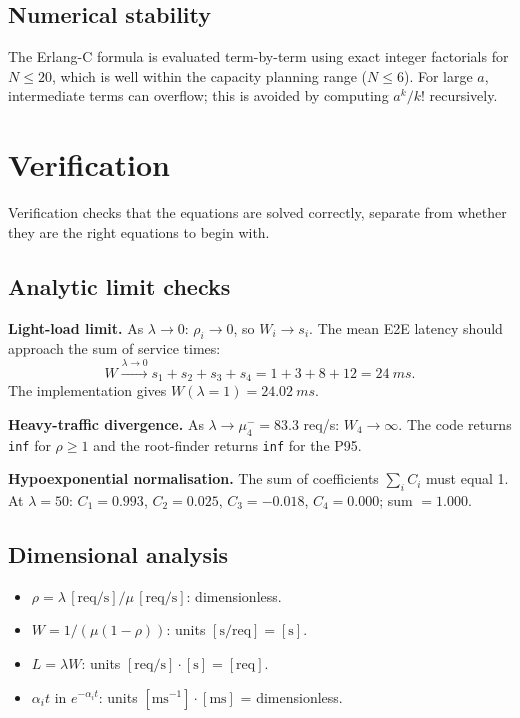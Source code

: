 \documentclass[12pt,a4paper]{article}
\begin{document}
\subsection{Numerical stability}

The Erlang-C formula is evaluated term-by-term using exact integer factorials for $N \leq 20$,
which is well within the capacity planning range ($N \leq 6$). For large $a$, intermediate
terms can overflow; this is avoided by computing $a^k/k!$ recursively.

\section{Verification}
\label{sec:verification}

Verification checks that the equations are solved correctly, separate from whether they
are the right equations to begin with.

\subsection{Analytic limit checks}

\textbf{Light-load limit.} As $\lambda \to 0$: $\rho_i \to 0$, so $W_i \to s_i$.
The mean E2E latency should approach the sum of service times:
\[
  W \xrightarrow{\lambda \to 0} s_1 + s_2 + s_3 + s_4 = 1 + 3 + 8 + 12 = \SI{24}{ms}.
\]
The implementation gives $W(\lambda = 1) = \SI{24.02}{ms}$.

\textbf{Heavy-traffic divergence.} As $\lambda \to \mu_4^- = 83.3$ req/s: $W_4 \to \infty$.
The code returns \texttt{inf} for $\rho \geq 1$ and the root-finder returns \texttt{inf}
for the P95.

\textbf{Hypoexponential normalisation.} The sum of coefficients $\sum_i C_i$ must equal 1.
At $\lambda = 50$: $C_1 = 0.993$, $C_2 = 0.025$, $C_3 = -0.018$, $C_4 = 0.000$;
sum $= 1.000$.

\subsection{Dimensional analysis}

\begin{itemize}
  \item $\rho = \lambda\,[\text{req/s}] / \mu\,[\text{req/s}]$: dimensionless.
  \item $W = 1/(\mu(1-\rho))$: units $[\text{s/req}] = [\text{s}]$.
  \item $L = \lambda W$: units $[\text{req/s}] \cdot [\text{s}] = [\text{req}]$.
  \item $\alpha_i t$ in $e^{-\alpha_i t}$: units $[\text{ms}^{-1}]\cdot[\text{ms}]$ = dimensionless.
\end{itemize}
\end{document}
